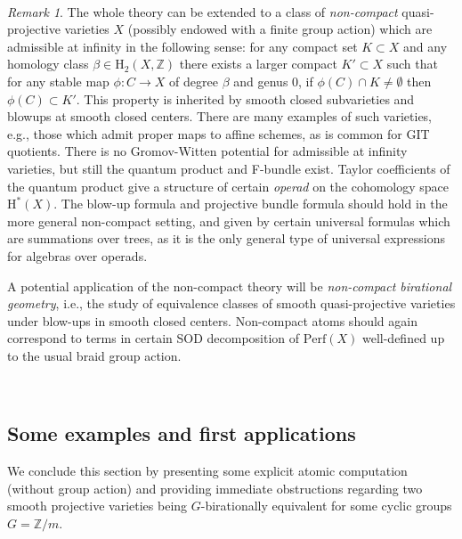 \documentclass[12pt,a4paper]{amsart}
\theoremstyle{definition}
\theoremstyle{remark}
\newtheorem{remark}[theorem]{Remark}
\newcommand{\Z}{\mathbb{Z}}
\newcommand{\rH}{\mathrm{H}}
\begin{document}
\ 

\begin{remark}\label{rem:noncompact}
    The whole theory can be extended to a class of \textit{non-compact} quasi-projective varieties $X$ (possibly endowed with a finite group action) which are admissible at infinity in the  following sense: for any compact set $K\subset X$ and any homology class $\beta\in \rH_2(X,\Z)$ there exists a larger compact $K'\subset X$ such that for any stable map $\phi:C\to X$ of degree $\beta$ and genus $0$, if $\phi(C)\cap K\ne \emptyset$ then $\phi(C)\subset K'$. This property is inherited by smooth closed subvarieties and blowups at smooth closed centers. There are many examples of such varieties, e.g., those which admit proper maps to affine schemes, as is common for GIT quotients. 
 There is no Gromov-Witten potential for admissible at infinity varieties, but still the quantum product and F-bundle exist. Taylor coefficients of the quantum product give a structure of certain \textit{operad} on the cohomology space $\rH^*(X)$.
  The blow-up formula and projective bundle formula should hold in the more general non-compact setting, and given by certain universal formulas which are summations over trees, as it is the only general type of universal expressions for algebras over operads.

  A potential application of the non-compact theory will be \textit{non-compact birational geometry}, i.e., the study of equivalence classes of smooth quasi-projective varieties under blow-ups in smooth closed centers. Non-compact atoms should again correspond to terms in certain SOD decomposition of $\mathrm{Perf}(X)$ well-defined up to the usual braid group action.
\end{remark}


\ 

\subsection{Some examples and first applications}
\label{sec:examples-atoms}
We conclude this section by presenting some explicit atomic computation (without group action) and providing immediate obstructions regarding two smooth projective varieties being $G$-birationally equivalent for some cyclic groups $G=\Z/m$.

\end{document}

